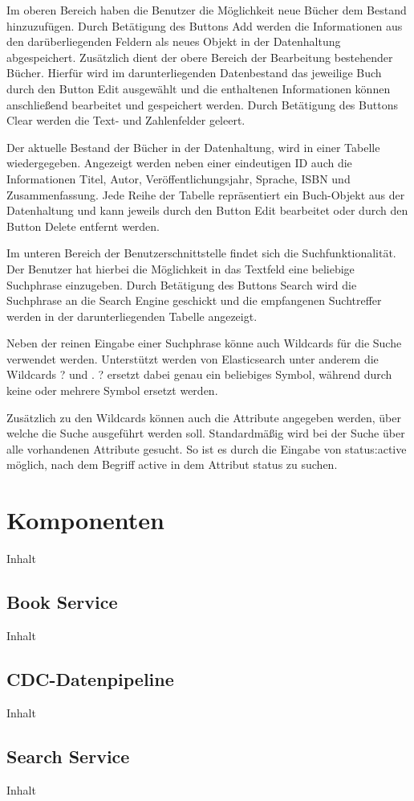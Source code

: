 Im oberen Bereich haben die Benutzer die Möglichkeit neue Bücher dem Bestand hinzuzufügen. Durch Betätigung des Buttons \glqq Add\grqq{} werden die Informationen aus den darüberliegenden Feldern als neues Objekt in der Datenhaltung abgespeichert. Zusätzlich dient der obere Bereich der Bearbeitung bestehender Bücher. Hierfür wird im darunterliegenden Datenbestand das jeweilige Buch durch den Button \glqq Edit\grqq{} ausgewählt und die enthaltenen Informationen können anschließend bearbeitet und gespeichert werden. Durch Betätigung des Buttons \glqq Clear\grqq{} werden die Text- und Zahlenfelder geleert.

Der aktuelle Bestand der Bücher in der Datenhaltung, wird in einer Tabelle wiedergegeben. Angezeigt werden neben einer eindeutigen ID auch die Informationen Titel, Autor, Veröffentlichungsjahr, Sprache, ISBN und Zusammenfassung. Jede Reihe der Tabelle repräsentiert ein Buch-Objekt aus der Datenhaltung und kann jeweils durch den Button \glqq Edit\grqq{} bearbeitet oder durch den Button \glqq Delete\grqq{} entfernt werden.

Im unteren Bereich der Benutzerschnittstelle findet sich die Suchfunktionalität. Der Benutzer hat hierbei die Möglichkeit in das Textfeld eine beliebige Suchphrase einzugeben. Durch Betätigung des Buttons \glqq Search\grqq{} wird die Suchphrase an die Search Engine geschickt und die empfangenen Suchtreffer werden in der darunterliegenden Tabelle angezeigt.

Neben der reinen Eingabe einer Suchphrase könne auch Wildcards für die Suche verwendet werden. Unterstützt werden von Elasticsearch unter anderem die Wildcards \glqq ?\grqq{} und \glqq *\grqq{}. \glqq ?\grqq{} ersetzt dabei genau ein beliebiges Symbol, während durch \glqq *\grqq{} keine oder mehrere Symbol ersetzt werden.

Zusätzlich zu den Wildcards können auch die Attribute angegeben werden, über welche die Suche ausgeführt werden soll. Standardmäßig wird bei der Suche über alle vorhandenen Attribute gesucht. So ist es durch die Eingabe von \glqq status:active\grqq{} möglich, nach dem Begriff \glqq active\grqq{} in dem Attribut \glqq status\grqq{} zu suchen.

\section{Komponenten\label{sec5.2:Unterpunkt-2}}

Inhalt

\subsection{Book Service\label{sec5.2.1:Unterunterpunkt-1}}

Inhalt

\subsection{CDC-Datenpipeline\label{sec5.2.2:Unterunterpunkt-2}}

Inhalt

\subsection{Search Service\label{sec5.2.3:Unterunterpunkt-3}}

Inhalt